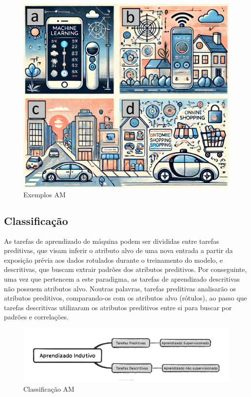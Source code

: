 \documentclass[a4paper,12pt]{book}
\begin{document}
	\begin{figure}
		\centering
		\includegraphics[width=0.7\linewidth]{figuras/exemplos_am}
		\caption{Exemplos AM}
		\label{fig:exemplosam}
	\end{figure}
	 
	\subsection{Classificação}
	
	As tarefas de aprendizado de máquina podem ser divididas entre tarefas preditivas, que visam inferir o atributo alvo de uma nova entrada a partir da exposição prévia aos dados rotulados durante o treinamento do modelo, e descritivas, que buscam extrair padrões dos atributos preditivos. Por conseguinte, uma vez que pertencem a este paradigma, as tarefas de aprendizado descritivas não possuem atributos alvo. Noutras palavras, tarefas preditivas analisarão os atributos preditivos, comparando-os com os atributos alvo (rótulos), ao passo que tarefas descritivas utilizaram os atributos preditivos entre si para buscar por padrões e correlações.
	
	\begin{figure}[h]
		\centering
		\includegraphics[width=1\linewidth]{figuras/indutivo.png}
		\caption{Classificação AM}
		\label{fig:indutivo}
	\end{figure}
	
\end{document}
